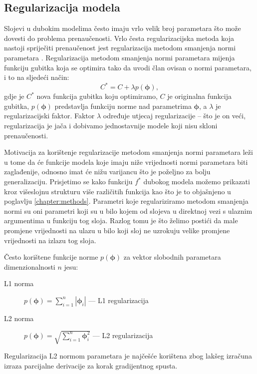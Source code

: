 \documentclass[times, utf8, diplomski, numeric]{fer}
\begin{document}
\subsection{Regularizacija modela} \label{subsection:regularization}

Slojevi u dubokim modelima često imaju vrlo velik broj parametara što može dovesti do problema prenaučenosti.
Vrlo česta regularizacijska metoda koja nastoji spriječiti prenaučenost jest regularizacija metodom smanjenja normi parametara .
Regularizacija metodom smanjenja normi parametara mijenja funkciju gubitka koja se optimira tako da uvodi član ovisan o normi parametara, i to na sljedeći način:
\begin{equation}
 C^* = C + \lambda p(\boldsymbol{\phi}),
\end{equation}
gdje je $C^*$ nova funkcija gubitka koju optimiramo, $C$ je originalna funkcija gubitka, $p(\boldsymbol{\phi})$ predstavlja funkciju norme nad parametrima $\boldsymbol{\phi}$, a $\lambda$ je regularizacijski faktor.
Faktor $\lambda$ određuje utjecaj regularizacije -- što je on veći, regularizacija je jača i dobivamo jednostavnije modele koji nisu skloni prenaučenosti.

Motivacija za korištenje regularizacije metodom smanjenja normi parametara leži u tome da će funkcije modela koje imaju niže vrijednosti normi parametara biti zaglađenije, odnosno imat će nižu varijancu što je poželjno za bolju generalizaciju.
Prisjetimo se kako funkciju $f^*$ dubokog modela možemo prikazati kroz višeslojnu strukturu više različitih funkcija kao što je to objašnjeno u poglavlju \ref{chapter:methods}.
Parametri koje regulariziramo metodom smanjenja normi su oni parametri koji su u bilo kojem od slojeva u direktnoj vezi s ulaznim argumentima u funkciju tog sloja.
Razlog tomu je što želimo postići da male promjene vrijednosti na ulazu u bilo koji sloj ne uzrokuju velike promjene vrijednosti na izlazu tog sloja.

Često korištene funkcije norme $p(\boldsymbol{\phi})$ za vektor slobodnih parametara dimenzionalnosti $n$ jesu:
\begin{description}
 \item [L1 norma] $p(\boldsymbol{\phi})=\sum_{i=1}^n \left| \boldsymbol{\phi}_i \right|$ --- L1  regularizacija
 \item [L2 norma] $p(\boldsymbol{\phi})=\sqrt{\sum_{i=1}^n  \boldsymbol{\phi}_i^2 }$ --- L2  regularizacija
\end{description}
Regularizacija L2 normom parametara je najčešće korištena zbog lakšeg izračuna izraza parcijalne derivacije za korak gradijentnog spusta.
\end{document}
